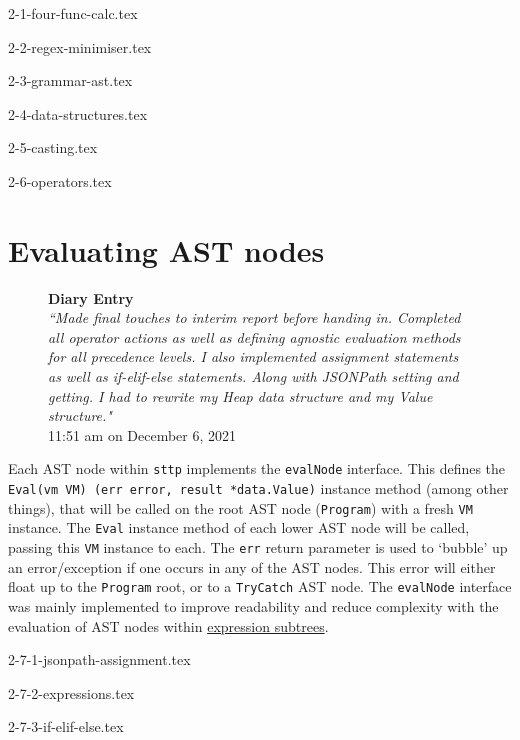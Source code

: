 \documentclass[]{full}
\theoremstyle{definition}
\begin{document}
{2-1-four-func-calc.tex}

{2-2-regex-minimiser.tex}

{2-3-grammar-ast.tex}

{2-4-data-structures.tex}

{2-5-casting.tex}

{2-6-operators.tex}

\section{Evaluating AST nodes}

\begin{figure}[H]
    \begin{center}
        \textbf{Diary Entry}\\[0.5em]
        \textit{``Made final touches to interim report before handing in. Completed all operator actions as well as defining agnostic evaluation methods for all precedence levels. I also implemented assignment statements as well as if-elif-else statements. Along with JSONPath setting and getting. I had to rewrite my Heap data structure and my Value structure."}\\[0.5em]
        \tiny{11:51 am on December 6, 2021}
    \end{center}
\end{figure}
    
Each AST node within \verb|sttp| implements the \verb|evalNode| interface. This defines the \texttt{Eval(vm VM) (err error, result *data.Value)} instance method (among other things), that will be called on the root AST node (\verb|Program|) with a fresh \verb|VM| instance. The \verb|Eval| instance method of each lower AST node will be called, passing this \verb|VM| instance to each. The \verb|err| return parameter is used to `bubble' up an error/exception if one occurs in any of the AST nodes. This error will either float up to the \verb|Program| root, or to a \verb|TryCatch| AST node. The \verb|evalNode| interface was mainly implemented to improve readability and reduce complexity with the evaluation of AST nodes within \hyperref[sec:development-ast-nodes-expressions]{expression subtrees}.

{2-7-1-jsonpath-assignment.tex}

{2-7-2-expressions.tex}

{2-7-3-if-elif-else.tex}
\end{document}
